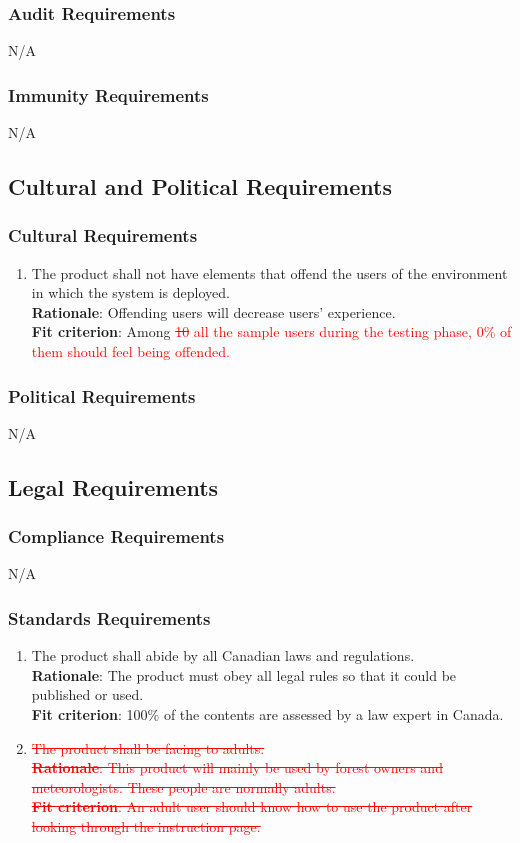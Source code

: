\documentclass{article}
\begin{document}
\subsubsection{Audit Requirements}
 N/A

\subsubsection{Immunity Requirements}
N/A
\subsection{Cultural and Political Requirements}
\subsubsection{Cultural Requirements}
\begin{enumerate}[CP1.1]
    \item The product shall not have elements that offend the users of the environment in which the system is deployed.\\
    \textbf{Rationale}: Offending users will decrease users' experience.\\
    \textbf{Fit criterion}: Among \textcolor{red}{\st{10} all the sample users during the testing 
    phase, 0\% of them should feel being offended.}
\end{enumerate}
\subsubsection{Political Requirements}
N/A
\subsection{Legal Requirements}
\subsubsection{Compliance Requirements}
N/A
\subsubsection{Standards Requirements}
\begin{enumerate}[LR2.1]
    \item The product shall abide by all Canadian laws and regulations.\\
    \textbf{Rationale}: The product must obey all legal rules so that it could be published or used.\\
    \textbf{Fit criterion}: 100\% of the contents are assessed by a law expert in Canada.\\
    
    \item \textcolor{red}{\st{The product shall be facing to adults.\\
    \textbf{Rationale}: This product will mainly be used by forest 
    owners and meteorologists. These people are normally adults. \\ 
    \textbf{Fit criterion}: An adult user should know how to use
    the product after looking through the instruction page.}}
\end{enumerate}
\end{document}
